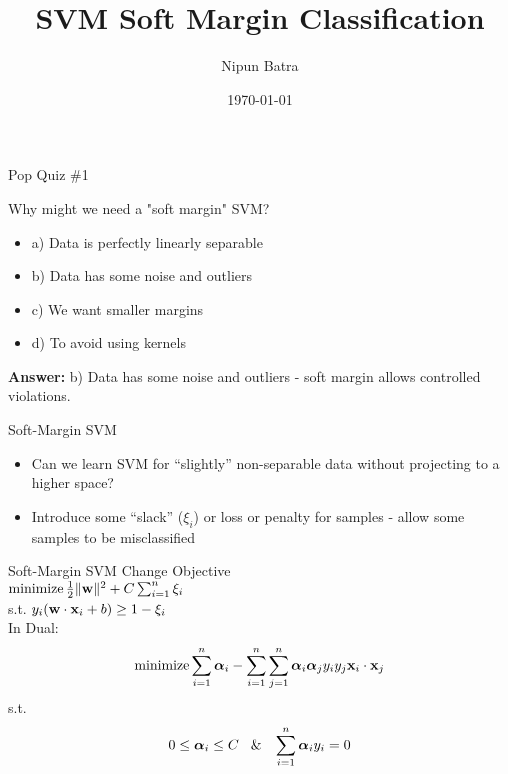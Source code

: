 \documentclass{beamer}
\title{SVM Soft Margin Classification}
\date{\today}
\author{Nipun Batra}
\institute{IIT Gandhinagar}
\begin{document}
	\maketitle
	
{
	
}

	
	\begin{frame}{Pop Quiz \#1}
	\begin{tcolorbox}[colback=blue!5!white,colframe=blue!75!black,title=Quick Question!]
	Why might we need a "soft margin" SVM?
	\begin{itemize}
		\item a) Data is perfectly linearly separable
		\item b) Data has some noise and outliers
		\item c) We want smaller margins
		\item d) To avoid using kernels
	\end{itemize}
	\pause
	\textbf{Answer:} b) Data has some noise and outliers - soft margin allows controlled violations.
	\end{tcolorbox}
	\end{frame}

	\begin{frame}{Soft-Margin SVM}
	\begin{itemize}[<+->]
		\item Can we learn SVM for ``slightly'' non-separable data without projecting to a higher space? 
		\item Introduce some ``slack'' ($\xi_i$) or loss or penalty for samples - allow some samples to be misclassified
		
	\end{itemize}
		
		
		
	\end{frame}

{
	
}
	
	\begin{frame}{Soft-Margin SVM}
		Change Objective \\
		\vspace{0.1cm}
		$\operatorname{minimize} \frac{1}{2}\|\mathbf{w}\|^{2} + C \sum_{i=1}^{n}\xi_{i}$ \\ s.t. $y_{i}(\mathbf{w} \cdot \mathbf{x}_i + b) \geq 1 - \xi_{i}$ \\
		
		\vspace{0.2cm}
		\pause In Dual:
		$$\operatorname{minimize} \sum_{i=1}^{n}\boldsymbol{\alpha}_{i} - \sum_{i=1}^{n}\sum_{j=1}^{n}\boldsymbol{\alpha}_{i}\boldsymbol{\alpha}_{j}y_{i}y_{j}\mathbf{x}_{i} \cdot \mathbf{x}_{j}$$
		s.t.
		$$0 \leq \boldsymbol{\alpha}_{i} \leq C \text{\hspace{0.3cm}\&\hspace{0.3cm}} \sum_{i=1}^{n}\boldsymbol{\alpha}_{i}y_{i} = 0$$
		
	\end{frame}
\end{document}
